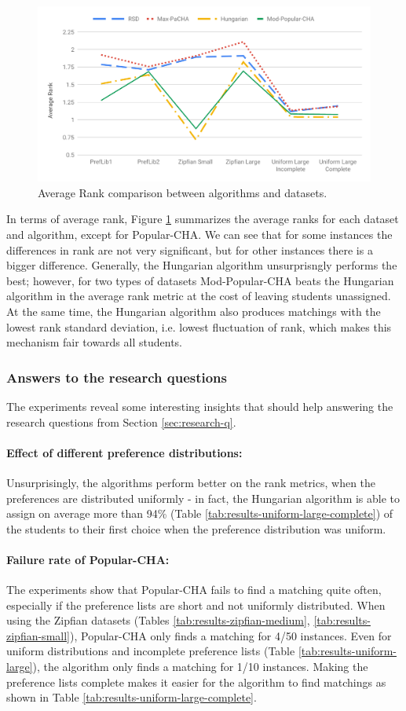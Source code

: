 \begin{figure}[h!]
  \centering
    \includegraphics[width=0.8\linewidth]{assets/plots/average_ranks_all.pdf}
    \caption{Average Rank comparison between algorithms and datasets.}
    \label{fig:average_ranks}
\end{figure}

In terms of average rank, Figure \ref{fig:average_ranks} summarizes the average ranks for each dataset and algorithm, except for Popular-CHA. We can see that for some instances the differences in rank are not very significant, but for other instances there is a bigger difference. Generally, the Hungarian algorithm unsurprisngly performs the best; however, for two types of datasets Mod-Popular-CHA beats the Hungarian algorithm in the average rank metric at the cost of leaving students unassigned. At the same time, the Hungarian algorithm also produces matchings with the lowest rank standard deviation, i.e. lowest fluctuation of rank, which makes this mechanism fair towards all students.

\subsubsection{Answers to the research questions}
The experiments reveal some interesting insights that should help answering the research questions from Section \ref{sec:research-q}.

\paragraph{Effect of different preference distributions:} Unsurprisingly, the algorithms perform better on the rank metrics, when the preferences are distributed uniformly - in fact, the Hungarian algorithm is able to assign on average more than 94\% (Table \ref{tab:results-uniform-large-complete}) of the students to their first choice when the preference distribution was uniform.
\paragraph{Failure rate of Popular-CHA:} The experiments show that \mbox{Popular-CHA} fails to find a matching quite often, especially if the preference lists are short and not uniformly distributed. When using the Zipfian datasets (Tables \ref{tab:results-zipfian-medium}, \ref{tab:results-zipfian-small}), Popular-CHA only finds a matching for 4/50 instances. Even for uniform distributions and incomplete preference lists (Table \ref{tab:results-uniform-large}), the algorithm only finds a matching for 1/10 instances. Making the preference lists complete makes it easier for the algorithm to find matchings as shown in Table \ref{tab:results-uniform-large-complete}.
